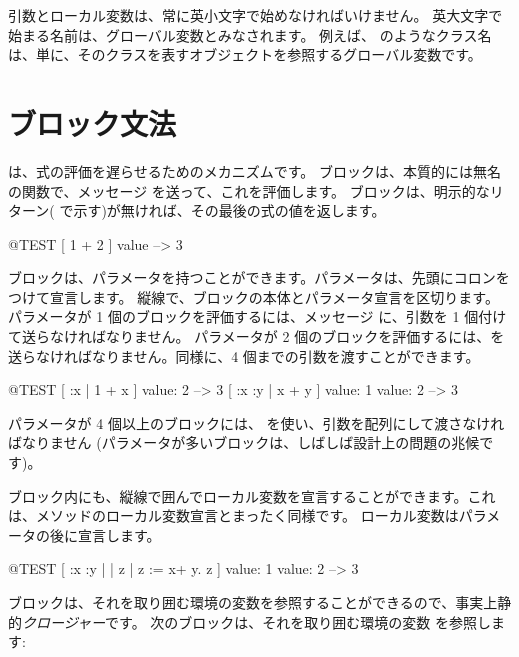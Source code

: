 \documentclass[a4paper,10pt,twoside]{book}
\begin{document}
引数とローカル変数は、常に英小文字で始めなければいけません。
英大文字で始まる名前は、グローバル変数とみなされます。
例えば、 のようなクラス名は、単に、そのクラスを表すオブジェクトを参照するグローバル変数です。

\section{ブロック文法}

は、式の評価を遅らせるためのメカニズムです。
ブロックは、本質的には無名の関数で、メッセージ  を送って、これを評価します。
ブロックは、明示的なリターン(\ct{^} で示す)が無ければ、その最後の式の値を返します。

\begin{code}{@TEST}
[ 1 + 2 ] value --> 3
\end{code}

ブロックは、パラメータを持つことができます。パラメータは、先頭にコロンをつけて宣言します。
縦線で、ブロックの本体とパラメータ宣言を区切ります。
パラメータが 1 個のブロックを評価するには、メッセージ  に、引数を 1 個付けて送らなければなりません。
パラメータが 2 個のブロックを評価するには、を送らなければなりません。同様に、4 個までの引数を渡すことができます。

\begin{code}{@TEST}
[ :x | 1 + x ] value: 2 --> 3
[ :x :y | x + y ] value: 1 value: 2 --> 3
\end{code}

パラメータが 4 個以上のブロックには、 を使い、引数を配列にして渡さなければなりません
(パラメータが多いブロックは、しばしば設計上の問題の兆候です)。

ブロック内にも、縦線で囲んでローカル変数を宣言することができます。これは、メソッドのローカル変数宣言とまったく同様です。
ローカル変数はパラメータの後に宣言します。

\begin{code}{@TEST}
[ :x :y | | z | z := x+ y. z ] value: 1 value: 2 --> 3
\end{code}

ブロックは、それを取り囲む環境の変数を参照することができるので、事実上静的\emph{クロージャー}です。
次のブロックは、それを取り囲む環境の変数  を参照します:
\end{document}
